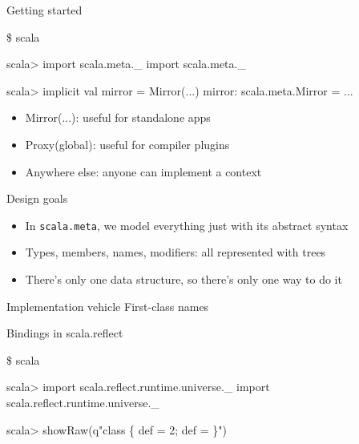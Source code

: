 \documentclass[svgnames,dvipsnames,hyperref={bookmarks=false},usepdftitle=false]{beamer}
\begin{document}

\begin{frame}[fragile]{Getting started}
\begin{semiverbatim}
\$ scala

scala> import scala.meta.\_
import scala.meta.\_

scala> implicit val mirror = Mirror(...)
mirror: scala.meta.Mirror = ...
\end{semiverbatim}

\vskip25pt
\begin{itemize}
\item<2-> Mirror(...): useful for standalone apps
\item<3-> Proxy(global): useful for compiler plugins
\item<4-> Anywhere else: anyone can implement a context
\end{itemize}
\end{frame}

\begin{frame}{Design goals}
\begin{itemize}
\item In \texttt{scala.meta}, we model everything just with its abstract syntax
\item Types, members, names, modifiers: all represented with trees
\item There's only one data structure, so there's only one way to do it
\end{itemize}
\end{frame}

\begin{frame}{Implementation vehicle}
First-class names
\end{frame}

\begin{frame}[fragile]{Bindings in scala.reflect}
\begin{semiverbatim}
\small
\$ scala

scala> import scala.reflect.runtime.universe.\_
import scala.reflect.runtime.universe.\_

scala> showRaw(q"class  \{ def  = 2; def  =  \}")
\end{semiverbatim}
\end{frame}
\end{document}
